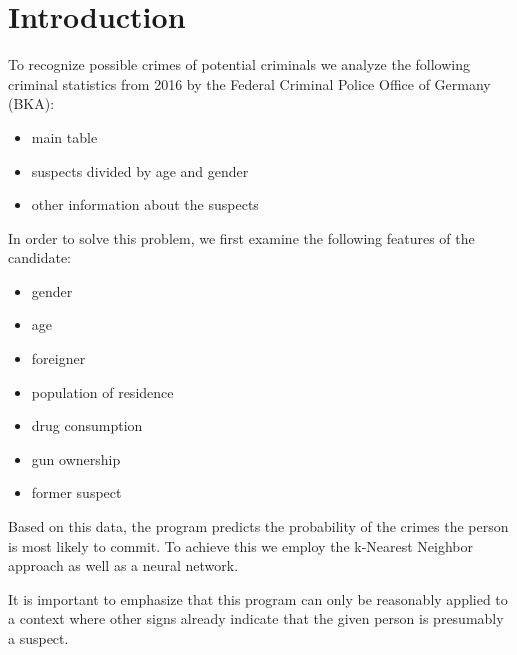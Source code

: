 \section{Introduction}

To recognize possible crimes of potential criminals we analyze the following criminal statistics from 2016 by the Federal Criminal Police Office of Germany (BKA):

\vspace*{-0.2cm}

\begin{itemize}
	\setlength{\itemsep}{-2pt}
	\item main table
	\item suspects divided by age and gender
	\item other information about the suspects
\end{itemize}
In order to solve this problem, we first examine the following features of the candidate:  

\vspace*{-0.2cm}

\begin{itemize}
	\setlength{\itemsep}{-2pt}
	\item gender
	\item age
	\item foreigner
	\item population of residence
	\item drug consumption
	\item gun ownership
	\item former suspect
\end{itemize}
Based on this data, the program predicts the probability of the crimes the person is most likely to commit. To achieve this we employ the k-Nearest Neighbor approach as well as a neural network.   

It is important to emphasize that this program can only be reasonably applied to a context where other signs already indicate that the given person is presumably a suspect.